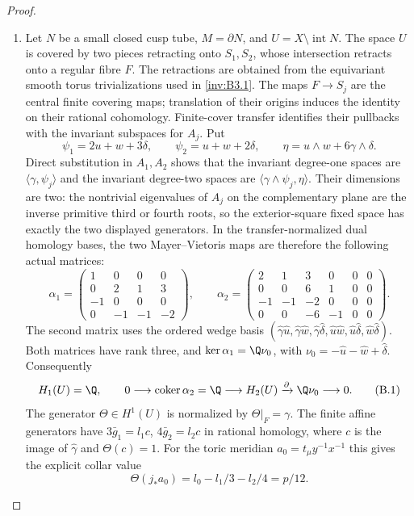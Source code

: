 \begin{proof}
\begin{enumerate}[label={$\langle1\rangle$\arabic*.},leftmargin=*]
\item Let $N$ be a small closed cusp tube, $M=\partial N$, and
$U=X\setminus\operatorname{int}N$. The space $U$ is covered by
two pieces retracting onto $S_1,S_2$, whose intersection retracts
onto a regular fibre $F$. The retractions are obtained from the
equivariant smooth torus trivializations used in \ref{inv:B3.1}. The maps
$F\to S_j$ are the central finite covering maps; translation of
their origins induces the identity on their rational cohomology.
Finite-cover transfer identifies their pullbacks with the invariant
subspaces for $A_j$. Put
\[
 \psi_1=2u+w+3\delta,\qquad \psi_2=u+w+2\delta,
 \qquad \eta=u\wedge w+6\gamma\wedge\delta.
\]
Direct substitution in $A_1,A_2$ shows that the invariant
degree-one spaces are $\langle\gamma,\psi_j\rangle$ and the
invariant degree-two spaces are
$\langle\gamma\wedge\psi_j,\eta\rangle$.
Their dimensions are two: the nontrivial eigenvalues of $A_j$ on
the complementary plane are the inverse primitive third or fourth
roots, so the exterior-square fixed space has exactly the two
displayed generators.
In the transfer-normalized dual homology bases, the two
Mayer--Vietoris maps are therefore the following actual matrices:
\[
 \alpha_1=\begin{pmatrix}
 1&0&0&0\\0&2&1&3\\-1&0&0&0\\0&-1&-1&-2
 \end{pmatrix},\qquad
 \alpha_2=\begin{pmatrix}
 2&1&3&0&0&0\\0&0&6&1&0&0\\
 -1&-1&-2&0&0&0\\0&0&-6&-1&0&0
 \end{pmatrix}.
\]
The second matrix uses the ordered wedge basis
$(\hat\gamma\hat u,\hat\gamma\hat w,\hat\gamma\hat\delta,
\hat u\hat w,\hat u\hat\delta,\hat w\hat\delta)$.
Both matrices have rank three, and
$\ker\alpha_1=\Q\nu_0$, with
$\nu_0=-\hat u-\hat w+\hat\delta$.
Consequently
\[
 H_1(U)=\Q,\qquad
 0\longrightarrow\operatorname{coker}\alpha_2=\Q
 \longrightarrow H_2(U)
 \xrightarrow{\partial}\Q\nu_0\longrightarrow0.       \tag{B.1}
\]
The generator $\Theta\in H^1(U)$ is normalized by
$\Theta|_F=\gamma$. The finite affine generators have
$3\bar g_1=l_1c$, $4\bar g_2=l_2c$ in rational homology, where
$c$ is the image of $\hat\gamma$ and $\Theta(c)=1$.
For the toric meridian $a_0=t_\mu y^{-1}x^{-1}$ this gives the
explicit collar value
\[
 \Theta(j_*a_0)=l_0-l_1/3-l_2/4=p/12.                 \tag{B.2}
\]


\end{enumerate}
\end{proof}
